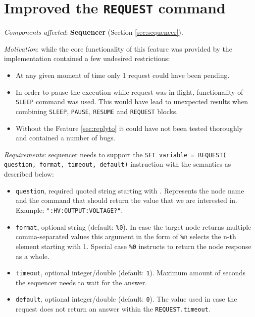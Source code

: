 \section{Improved the \texttt{REQUEST} command}
\label{sec:request}

\textit{Components affected}: \textbf{Sequencer} (Section \ref{sec:sequencer}).

\textit{Motivation}: while the core functionality of this feature was provided by \cite{Germann2019} the implementation contained a few undesired restrictions:

\begin{itemize}
	\item At any given moment of time only 1 request could have been pending.
	\item In order to pause the execution while request was in flight, functionality of \texttt{SLEEP} command was used. This would have lead to unexpected results when combining \texttt{SLEEP}, \texttt{PAUSE}, \texttt{RESUME} and \texttt{REQUEST} blocks.
	\item Without the Feature \ref{sec:replyto} it could have not been tested thoroughly and contained a number of bugs.
\end{itemize}

\textit{Requirements}: sequencer needs to support the \texttt{SET variable = REQUEST( question, format, timeout, default)} instruction with the semantics as described below:

\begin{itemize}
	\item \texttt{question}, required quoted string starting with \highlight{:}. Represents the node name and the  command that should return the value that we are interested in. Example: \texttt{":HV:OUTPUT:VOLTAGE?"}.
	\item \texttt{format}, optional string (default: \texttt{\%0}). In case the target node returns multiple comma-separated values this argument in the form of \texttt{\%n} selects the n-th element starting with 1. Special case \texttt{\%0} instructs to return the node response as a whole.
	\item \texttt{timeout}, optional integer/double (default: \texttt{1}). Maximum amount of seconds the sequencer needs to wait for the answer.
	\item \texttt{default}, optional integer/double (default: \texttt{0}). The value used in case the request does not return an answer within the \texttt{REQUEST.timeout}.
\end{itemize}

